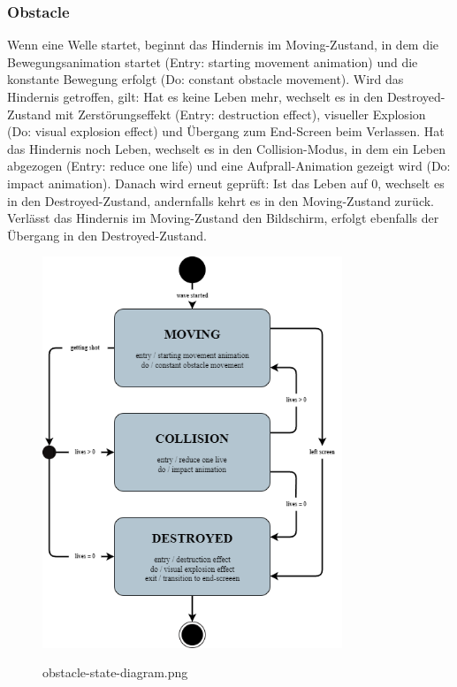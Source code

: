 \documentclass[10pt]{article}
\begin{document}
\newpage
\subsubsection{Obstacle}
Wenn eine Welle startet, beginnt das Hindernis im Moving-Zustand, in dem die Bewegungsanimation startet (Entry: starting movement animation) und die konstante Bewegung erfolgt (Do: constant obstacle movement).
Wird das Hindernis getroffen, gilt: Hat es keine Leben mehr, wechselt es in den Destroyed-Zustand mit Zerstörungseffekt (Entry: destruction effect), visueller Explosion (Do: visual explosion effect) und Übergang zum End-Screen beim Verlassen. Hat das Hindernis noch Leben, wechselt es in den Collision-Modus, in dem ein Leben abgezogen (Entry: reduce one life) und eine Aufprall-Animation gezeigt wird (Do: impact animation). Danach wird erneut geprüft: Ist das Leben auf 0, wechselt es in den Destroyed-Zustand, andernfalls kehrt es in den Moving-Zustand zurück.
Verlässt das Hindernis im Moving-Zustand den Bildschirm, erfolgt ebenfalls der Übergang in den Destroyed-Zustand.
\begin{figure}
	\centering
	\includegraphics[width=0.8\textwidth]{../../../images/Pflichtenheft_Assets/uml-state-diagram/obstacle-state-diagram.png}\\
	\caption{obstacle-state-diagram.png}
\end{figure}
\end{document}
